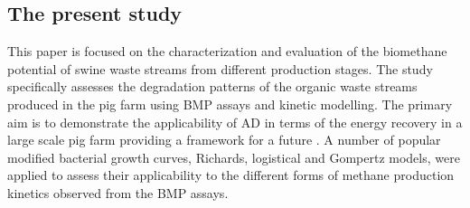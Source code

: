 \subsection{The present study}
This paper is focused on the characterization and evaluation of the biomethane potential of swine waste streams from different production stages. The study specifically assesses the degradation patterns of the organic waste streams produced in the pig farm using BMP assays and kinetic modelling. The primary aim is to demonstrate the applicability of AD in terms of the energy recovery in a large scale pig farm providing a framework for a future  . A number of popular modified bacterial growth curves, Richards, logistical and Gompertz models, were applied to assess their applicability to the different forms of methane production kinetics observed from the BMP assays.